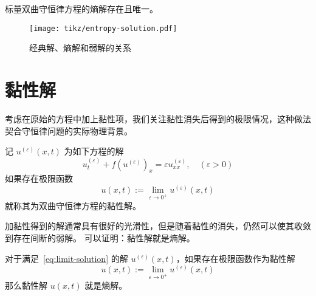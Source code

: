 \begin{theorem}
    标量双曲守恒律方程的熵解存在且唯一。
\end{theorem}

\begin{figure}[htbp]
    \centering
    \texttt{[image: tikz/entropy-solution.pdf]}
    \caption{经典解、熵解和弱解的关系} \label{fig:entropy-solution}
\end{figure}

\section{黏性解}

考虑在原始的方程中加上黏性项，我们关注黏性消失后得到的极限情况，这种做法契合守恒律问题的实际物理背景。

\begin{definition}
    记 $u^{(\varepsilon)}(x,t)$ 为如下方程的解
    \begin{equation}
        u^{(\varepsilon)}_t + f(u^{(\varepsilon)})_x = \varepsilon u^{(\varepsilon)}_{xx},\quad(\varepsilon > 0) \label{eq:limit-solution}
    \end{equation}
    如果存在极限函数
    \[
        u(x,t) := \lim_{\varepsilon \to 0^+} u^{(\varepsilon)}(x,t)
    \]就称其为双曲守恒律方程的黏性解。
\end{definition}

加黏性得到的解通常具有很好的光滑性，但是随着黏性的消失，仍然可以使其收敛到存在间断的弱解。
可以证明：黏性解就是熵解。

\begin{theorem}
    对于满足~\eqref{eq:limit-solution} 的解 $u^{(\varepsilon)}(x,t)$，如果存在极限函数作为黏性解
    \[
        u(x,t) := \lim_{\varepsilon \to 0^+} u^{(\varepsilon)}(x,t)
    \]
    那么黏性解 $u(x,t)$ 就是熵解。
\end{theorem}

